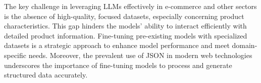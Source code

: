 The key challenge in leveraging LLMs effectively in e-commerce and other sectors is the absence of high-quality, focused datasets, especially concerning product characteristics. This gap hinders the models' ability to interact efficiently with detailed product information. Fine-tuning pre-existing models with specialized datasets is a strategic approach to enhance model performance and meet domain-specific needs. Moreover, the prevalent use of JSON in modern web technologies underscores the importance of fine-tuning models to process and generate structured data accurately.